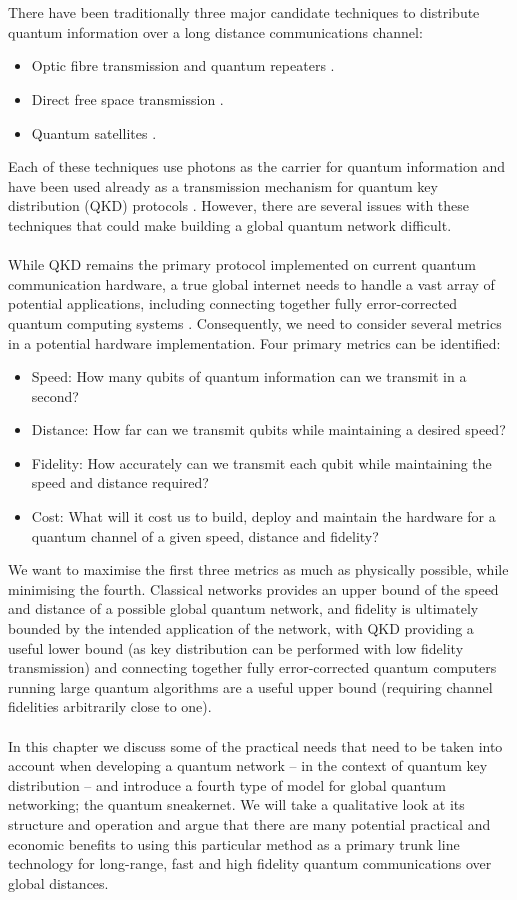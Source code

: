 \documentclass[aps,prl,twocolumn,10pt,nofootinbib]{revtex4}
\begin{document}
\\
\\
There have been traditionally three major candidate techniques to distribute quantum information over a long distance communications channel:
\begin{itemize}
\item Optic fibre transmission and quantum repeaters \cite{?}.
\item Direct free space transmission \cite{?}.
\item Quantum satellites \cite{?}. 
\end{itemize}
Each of these techniques use photons as the carrier for quantum information and have been used already as a transmission mechanism for quantum key distribution (QKD) protocols \cite{?}.   However, there are several issues with these techniques that could make building a global quantum network difficult.  
\\
\\
While QKD remains the primary protocol implemented on current quantum communication hardware, a true global internet needs to handle a vast array of potential applications, including connecting together fully error-corrected quantum computing systems \cite{?}.  Consequently, we need to consider several metrics in a potential hardware implementation.  Four primary metrics can be identified:
\begin{itemize}
\item Speed:  How many qubits of quantum information can we transmit in a second?
\item Distance: How far can we transmit qubits while maintaining a desired speed?
\item Fidelity: How accurately can we transmit each qubit while maintaining the speed and distance required?
\item Cost: What will it cost us to build, deploy and maintain the hardware for a quantum channel of a given speed, distance and fidelity?
\end{itemize}
We want to maximise the first three metrics as much as physically possible, while minimising the fourth.  Classical networks provides an upper bound of the speed and distance of a possible global quantum network, and fidelity is ultimately bounded by the intended application of the network, with QKD providing a useful lower bound (as key distribution can be performed with low fidelity transmission) and connecting together fully error-corrected quantum computers running large quantum algorithms are a useful upper bound (requiring channel fidelities arbitrarily close to one). 
\\
\\
In this chapter we discuss some of the practical needs that need to be taken into account when developing a quantum network -- in the context of quantum key distribution -- and introduce a fourth type of model for global quantum networking; the quantum sneakernet.  We will take a qualitative look at its structure and operation and argue that there are many potential practical and economic benefits to using this particular method as a primary trunk line technology for long-range, fast and high fidelity quantum communications over global distances.
\end{document}
